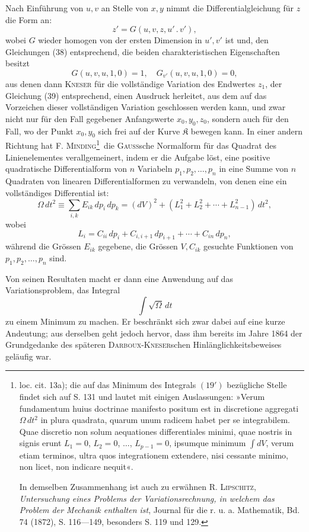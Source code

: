 Nach Einführung von $u,v$ an Stelle von $x,y$ nimmt die Differentialgleichung
für $z$ die Form an:
\[
z'=G(u,v,z,u'\mathpunct{.}v'),
\]
wobei $G$ wieder homogen von der ersten Dimension in $u',v'$ ist und, den
Gleichungen (38) entsprechend, die beiden charakteristischen Eigenschaften
besitzt
\begin{equation*}\tag{$38'$}
G(u,v,u,1,0)=1,\quad G_{v'}(u,v,u,1,0)=0,
\end{equation*}
aus denen dann \textsc{Kneser} für die vollständige Variation des Endwertes $z_1$, der
Gleichung (39) entsprechend, einen Ausdruck herleitet, aus dem auf das Vorzeichen
dieser vollständigen Variation geschlossen werden kann, und zwar
nicht nur für den Fall gegebener Anfangswerte $x_0,y_0,z_0$, sondern auch für
den Fall, wo der Punkt $x_0,y_0$ sich frei auf der Kurve $\mathfrak K$ bewegen kann.
\clearpage{}
\noindent\hspace*{\parindent}In einer andern Richtung hat F. \textsc{Minding}\begingroup\renewcommand{\thefootnote}{23b)}\footnote{loc. cit. 13a); die auf das Minimum des Integrals $(19')$ bezügliche Stelle findet sich auf S. 131
und lautet mit einigen Auslassungen: »Verum fundamentum huius doctrinae manifesto positum est in
discretione aggregati $\Omega\,dt^2$ in plura quadrata, quarum unum radicem habet per se integrabilem. Quae
discretio non solum aequationes differentiales minimi, quae nostris in signis erunt $L_1=0$, $L_2=0$, $\ldots$,
$L_{p-1}=0$, ipsumque minimum $\int dV$, verum etiam terminos, ultra quos integrationem extendere, nisi cessante
minimo, non licet, non indicare nequit«.
\par In demselben Zusammenhang ist auch zu erwähnen R. \textsc{Lipschitz}, \textit{Untersuchung eines Problems der
Variationsrechnung, in welchem das Problem der Mechanik enthalten ist}, Journal für die r. u. a. Mathematik,
Bd. 74 (1872), S. 116—149, besonders S. 119 und 129.}\endgroup\ die \textsc{Gauss}sche Normalform
für das Quadrat des Linienelementes verallgemeinert, indem er die Aufgabe
löst, eine positive quadratische Differentialform von $n$ Variabeln $p_1,p_2,\ldots,p_n$
in eine Summe von $n$ Quadraten von linearen Differentialformen zu verwandeln,
von denen eine ein vollständiges Differential ist:
\[
\Omega\,dt^2\equiv\sum_{i,k}E_{ik}\,dp_i\,dp_k=(dV)^2+(L_1^2+L_2^2+\cdots+L_{n-1}^2)\,dt^2,
\]
wobei
\[
L_i=C_{ii}\,dp_i+C_{i,i+1}\,dp_{i+1}+\cdots+C_{in}\,dp_n,
\]
während die Grössen $E_{ik}$ gegebene, die Grössen $V,C_{ik}$ gesuchte Funktionen
von $p_1,p_2,\ldots,p_n$ sind.

Von seinen Resultaten macht er dann eine Anwendung auf das Variationsproblem,
das Integral
\begin{equation*}\tag{$19'$}
\int\sqrt{\Omega}\,dt
\end{equation*}
zu einem Minimum zu machen. Er beschränkt sich zwar dabei auf eine
kurze Andeutung; aus derselben geht jedoch hervor, dass ihm bereits im
Jahre 1864 der Grundgedanke des späteren \textsc{Darboux-Kneser}schen Hinlänglichkeitsbeweises
geläufig war.
\par\clearpage\endgroup

